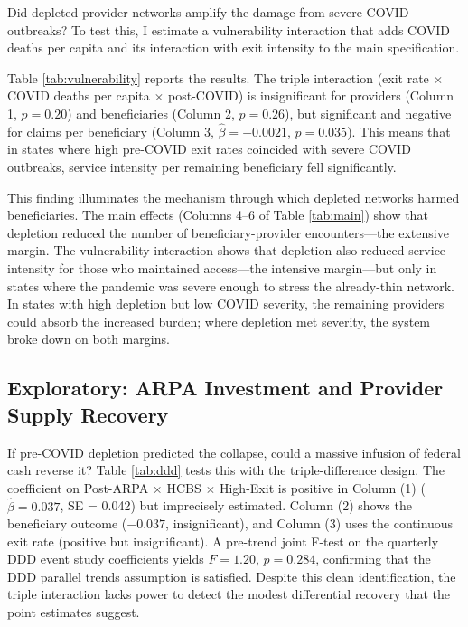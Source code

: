 \documentclass[12pt]{article}
\begin{document}
Did depleted provider networks amplify the damage from severe COVID outbreaks? To test this, I estimate a vulnerability interaction that adds COVID deaths per capita and its interaction with exit intensity to the main specification.



Table \ref{tab:vulnerability} reports the results. The triple interaction (exit rate $\times$ COVID deaths per capita $\times$ post-COVID) is insignificant for providers (Column 1, $p = 0.20$) and beneficiaries (Column 2, $p = 0.26$), but significant and negative for claims per beneficiary (Column 3, $\hat{\beta} = -0.0021$, $p = 0.035$). This means that in states where high pre-COVID exit rates coincided with severe COVID outbreaks, service intensity per remaining beneficiary fell significantly.

This finding illuminates the mechanism through which depleted networks harmed beneficiaries. The main effects (Columns 4--6 of Table \ref{tab:main}) show that depletion reduced the number of beneficiary-provider encounters---the extensive margin. The vulnerability interaction shows that depletion also reduced service intensity for those who maintained access---the intensive margin---but only in states where the pandemic was severe enough to stress the already-thin network. In states with high depletion but low COVID severity, the remaining providers could absorb the increased burden; where depletion met severity, the system broke down on both margins.

\subsection{Exploratory: ARPA Investment and Provider Supply Recovery}

If pre-COVID depletion predicted the collapse, could a massive infusion of federal cash reverse it? Table \ref{tab:ddd} tests this with the triple-difference design. The coefficient on Post-ARPA $\times$ HCBS $\times$ High-Exit is positive in Column (1) ($\hat{\beta} = 0.037$, SE = 0.042) but imprecisely estimated. Column (2) shows the beneficiary outcome ($-0.037$, insignificant), and Column (3) uses the continuous exit rate (positive but insignificant). A pre-trend joint F-test on the quarterly DDD event study coefficients yields $F = 1.20$, $p = 0.284$, confirming that the DDD parallel trends assumption is satisfied. Despite this clean identification, the triple interaction lacks power to detect the modest differential recovery that the point estimates suggest.
\end{document}
